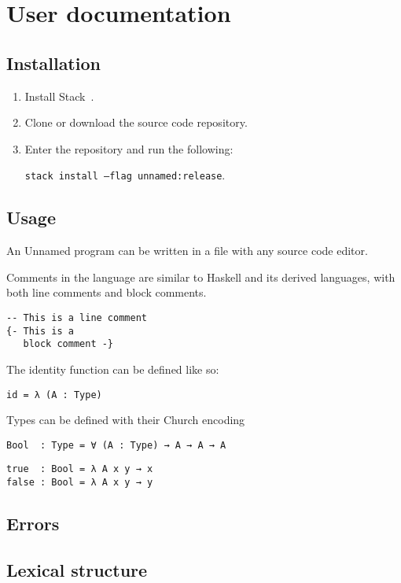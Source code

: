 \chapter{User documentation}\label{ch:userdocs}

\section{Installation}
\begin{enumerate}
  \item Install Stack~\cite{stack}.
  \item Clone or download the source code repository.
  \item Enter the repository and run the following:

        \texttt{stack install --flag unnamed:release}.
\end{enumerate}

\section{Usage}

An Unnamed program can be written in a file with any source code editor.

Comments in the language are similar to Haskell and its derived languages, with
both line comments and block comments.
\begin{verbatim}
-- This is a line comment
{- This is a
   block comment -}
\end{verbatim}

The identity function can be defined like so:
\begin{verbatim}
id = λ (A : Type)
\end{verbatim}

Types can be defined with their Church encoding
\begin{verbatim}
Bool  : Type = ∀ (A : Type) → A → A → A
\end{verbatim}

\begin{verbatim}
true  : Bool = λ A x y → x
false : Bool = λ A x y → y
\end{verbatim}

\section{Errors}

\section{Lexical structure}

